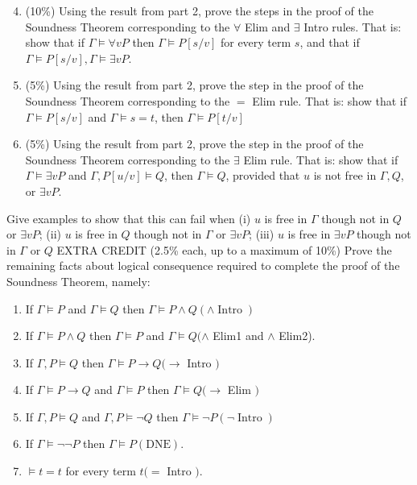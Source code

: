 \documentclass[10pt]{article}
\begin{document}
\begin{enumerate}
  \setcounter{enumi}{3}
  \item (10\%) Using the result from part 2, prove the steps in the proof of the Soundness Theorem corresponding to the $\forall$ Elim and $\exists$ Intro rules. That is: show that if $\Gamma \vDash \forall v P$ then $\Gamma \vDash P[s / v]$ for every term $s$, and that if $\Gamma \vDash P[s / v], \Gamma \vDash \exists v P$.

  \item (5\%) Using the result from part 2, prove the step in the proof of the Soundness Theorem corresponding to the $=$ Elim rule. That is: show that if $\Gamma \vDash P[s / v]$ and $\Gamma \vDash s=t$, then $\Gamma \vDash P[t / v]$

  \item (5\%) Using the result from part 2, prove the step in the proof of the Soundness Theorem corresponding to the $\exists$ Elim rule. That is: show that if $\Gamma \vDash \exists v P$ and $\Gamma, P[u / v] \vDash Q$, then $\Gamma \vDash Q$, provided that $u$ is not free in $\Gamma, Q$, or $\exists v P$.

\end{enumerate}
Give examples to show that this can fail when (i) $u$ is free in $\Gamma$ though not in $Q$ or $\exists v P$; (ii) $u$ is free in $Q$ though not in $\Gamma$ or $\exists v P$; (iii) $u$ is free in $\exists v P$ though not in $\Gamma$ or $Q$ EXTRA CREDIT (2.5\% each, up to a maximum of 10\%) Prove the remaining facts about logical consequence required to complete the proof of the Soundness Theorem, namely:

\begin{enumerate}
  \item If $\Gamma \vDash P$ and $\Gamma \vDash Q$ then $\Gamma \vDash P \wedge Q(\wedge \operatorname{Intro})$

  \item If $\Gamma \vDash P \wedge Q$ then $\Gamma \vDash P$ and $\Gamma \vDash Q(\wedge$ Elim1 and $\wedge$ Elim2).

  \item If $\Gamma, P \vDash Q$ then $\Gamma \vDash P \rightarrow Q(\rightarrow$ Intro $)$

  \item If $\Gamma \vDash P \rightarrow Q$ and $\Gamma \vDash P$ then $\Gamma \vDash Q(\rightarrow$ Elim $)$

  \item If $\Gamma, P \vDash Q$ and $\Gamma, P \vDash \neg Q$ then $\Gamma \vDash \neg P(\neg \operatorname{Intro})$

  \item If $\Gamma \vDash \neg \neg P$ then $\Gamma \vDash P(\mathrm{DNE})$.

  \item $\vDash t=t$ for every term $t(=$ Intro $)$.

\end{enumerate}
\end{document}
